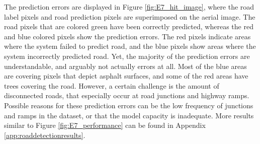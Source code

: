 The prediction errors are displayed in Figure \ref{fig:E7_hit_image}, where the road label pixels and road prediction pixels are superimposed on the aerial image. The road pixels that are colored green have been correctly predicted, whereas the red and blue colored pixels show the prediction errors. The red pixels indicate areas where the system failed to predict road, and the blue pixels show areas where the system incorrectly predicted road. Yet, the majority of the prediction errors are understandable, and arguably not actually errors at all. Most of the blue areas are covering pixels that depict asphalt surfaces, and some of the red areas have trees covering the road. However, a certain challenge is the amount of disconnected roads, that especially occur at road junctions and highway ramps. Possible reasons for these prediction errors can be the low frequency of junctions and ramps in the dataset, or that the model capacity is inadequate. More results similar to Figure \ref{fig:E7_performance} can be found in Appendix \ref{app:roaddetectionresults}.\\



